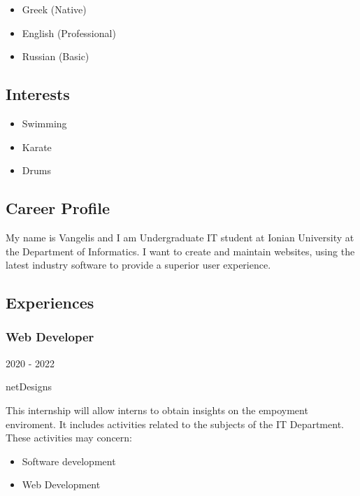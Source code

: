\documentclass[
]{article}
\providecommand{\tightlist}{%
  \setlength{\itemsep}{0pt}\setlength{\parskip}{0pt}}
\begin{document}
\begin{itemize}
\tightlist
\item
  Greek {(Native)}
\item
  English {(Professional)}
\item
  Russian {(Basic)}
\end{itemize}

\hypertarget{interests}{%
\subsection{Interests}\label{interests}}

\begin{itemize}
\tightlist
\item
  Swimming
\item
  Karate
\item
  Drums
\end{itemize}

\hypertarget{career-profile}{%
\subsection{\texorpdfstring{{ \emph{} \emph{} } Career
Profile}{    Career Profile}}\label{career-profile}}

My name is Vangelis and I am Undergraduate IT student at Ionian
University at the Department of Informatics. I want to create and
maintain websites, using the latest industry software to provide a
superior user experience.

\hypertarget{experiences}{%
\subsection{\texorpdfstring{{ \emph{} \emph{} }
Experiences}{    Experiences}}\label{experiences}}

\hypertarget{web-developer-1}{%
\subsubsection{Web Developer}\label{web-developer-1}}

2020 - 2022

netDesigns

This internship will allow interns to obtain insights on the empoyment
enviroment. It includes activities related to the subjects of the IT
Department. These activities may concern:

\begin{itemize}
\tightlist
\item
  Software development
\item
  Web Development
\end{itemize}
\end{document}
